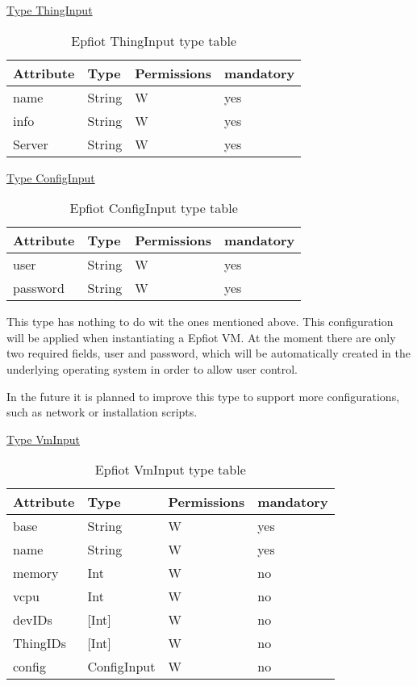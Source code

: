 \underline{Type ThingInput}
\begin{table}[H]
\begin{center}
\begin{tabular}[b]{|l|l|l|l|}
    \hline
    Attribute & Type & Permissions & mandatory \\
    \hline
    name & String & W & yes\\
    \hline
    info & String & W & yes\\
    \hline
    Server & String & W & yes\\
    \hline
\end{tabular}
\caption{Epfiot ThingInput type table}
\label{table1}
\end{center}
\end{table}

\underline{Type ConfigInput}
\begin{table}[H]
\begin{center}
\begin{tabular}[b]{|l|l|l|l|}
    \hline
    Attribute & Type & Permissions & mandatory \\
    \hline
    user & String & W & yes\\
    \hline
    password & String & W & yes\\
    \hline
\end{tabular}
\caption{Epfiot ConfigInput type table}
\label{table1}
\end{center}
\end{table}

This type has nothing to do wit the ones mentioned above.
This configuration will be applied when instantiating a Epfiot VM. At the moment there are only two required fields, user and password, which will be automatically created in the underlying operating system in order to allow user control.

In the future it is planned to improve this type to support more configurations, such as network or installation scripts.
\newpage

\underline{Type VmInput}
\begin{table}[H]
\begin{center}
\begin{tabular}[b]{|l|l|l|l|}
    \hline
    Attribute & Type & Permissions & mandatory \\
    \hline
    base & String & W & yes\\
    \hline
    name & String & W & yes\\
    \hline
    memory & Int & W & no\\
    \hline
    vcpu & Int & W & no\\
    \hline
    devIDs & [Int] & W & no\\
    \hline
    ThingIDs & [Int] & W & no\\
    \hline
    config & ConfigInput & W & no\\
    \hline
\end{tabular}
\caption{Epfiot VmInput type table}
\label{table1}
\end{center}
\end{table}


